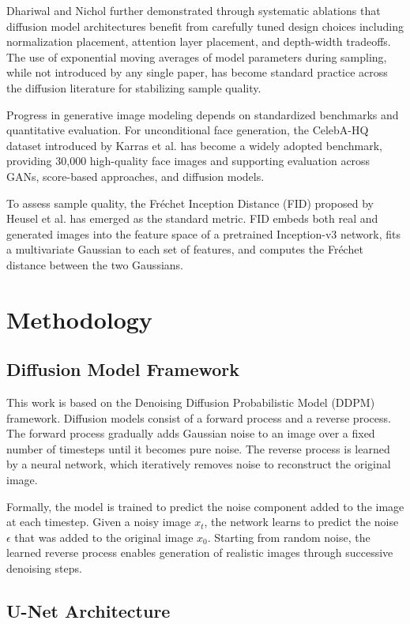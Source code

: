 \documentclass[conference]{IEEEtran}
\begin{document}
Dhariwal and Nichol \cite{b6} further demonstrated through systematic ablations that diffusion model architectures benefit from carefully tuned design choices including normalization placement, attention layer placement, and depth-width tradeoffs. The use of exponential moving averages of model parameters during sampling, while not introduced by any single paper, has become standard practice across the diffusion literature for stabilizing sample quality.

Progress in generative image modeling depends on standardized benchmarks and quantitative evaluation. For unconditional face generation, the CelebA-HQ dataset introduced by Karras et al. \cite{b12} has become a widely adopted benchmark, providing 30,000 high-quality face images and supporting evaluation across GANs, score-based approaches, and diffusion models.

To assess sample quality, the Fréchet Inception Distance (FID) proposed by Heusel et al. \cite{b13} has emerged as the standard metric. FID embeds both real and generated images into the feature space of a pretrained Inception-v3 network, fits a multivariate Gaussian to each set of features, and computes the Fréchet distance between the two Gaussians.


\section{Methodology}

\subsection{Diffusion Model Framework}

This work is based on the Denoising Diffusion Probabilistic Model (DDPM) framework. Diffusion models consist of a forward process and a reverse process. The forward process gradually adds Gaussian noise to an image over a fixed number of timesteps until it becomes pure noise. The reverse process is learned by a neural network, which iteratively removes noise to reconstruct the original image.

Formally, the model is trained to predict the noise component added to the image at each timestep. Given a noisy image $x_t$, the network learns to predict the noise $\epsilon$ that was added to the original image $x_0$. Starting from random noise, the learned reverse process enables generation of realistic images through successive denoising steps.

\subsection{U-Net Architecture}
\end{document}
